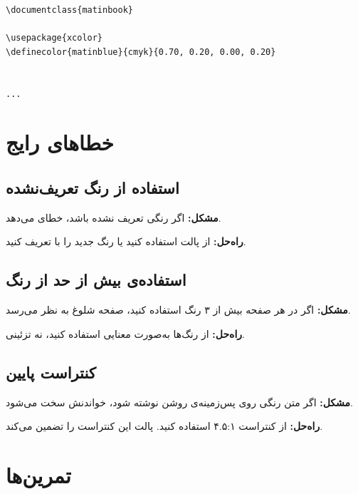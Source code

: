 \begin{latin}
\begin{verbatim}
\documentclass{matinbook}

\usepackage{xcolor}
\definecolor{matinblue}{cmyk}{0.70, 0.20, 0.00, 0.20}


...

\end{verbatim}
\end{latin}


\section{خطاهای رایج}
\label{sec:colors-mistakes}

\subsection{استفاده از رنگ تعریف‌نشده}
\label{sec:colors-mistake-undefined}

\textbf{مشکل:} اگر رنگی تعریف نشده باشد،
خطای  می‌دهد.

\textbf{راه‌حل:} از پالت  استفاده
کنید یا رنگ جدید را با 
تعریف کنید.

\subsection{استفاده‌ی بیش از حد از رنگ}
\label{sec:colors-mistake-toomuch}

\textbf{مشکل:} اگر در هر صفحه بیش از ۳ رنگ
استفاده کنید، صفحه شلوغ به نظر می‌رسد.

\textbf{راه‌حل:} از رنگ‌ها به‌صورت معنایی
استفاده کنید، نه تزئینی.

\subsection{کنتراست پایین}
\label{sec:colors-mistake-contrast}

\textbf{مشکل:} اگر متن رنگی روی پس‌زمینه‌ی
روشن نوشته شود، خواندنش سخت می‌شود.

\textbf{راه‌حل:} از کنتراست ۴.۵:۱ استفاده
کنید. پالت  این کنتراست را
تضمین می‌کند.

\section{تمرین‌ها}
\label{sec:colors-exercises}

